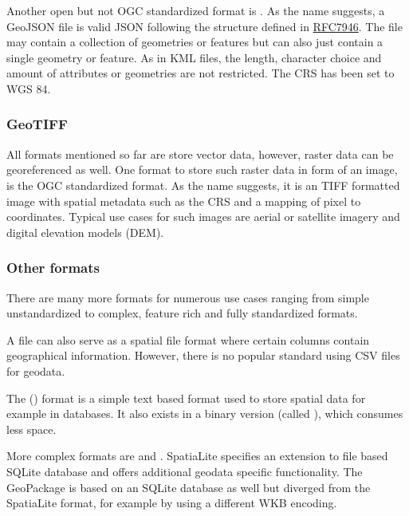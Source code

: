 			Another open but not OGC standardized format is .
			As the name suggests, a GeoJSON file is valid JSON following the structure defined in \href{https://datatracker.ietf.org/doc/html/rfc7946}{RFC7946}\cite{ietf-geojson}.
			The file may contain a collection of geometries or features but can also just contain a single geometry or feature.
			As in KML files, the length, character choice and amount of attributes or geometries are not restricted.
			The CRS has been set to WGS 84.
			
		\subsubsection{GeoTIFF}
		
			All formats mentioned so far are store vector data, however, raster data can be georeferenced as well.
			One format to store such raster data in form of an image, is the OGC standardized  format.
			As the name suggests, it is an TIFF formatted image with spatial metadata such as the CRS and a mapping of pixel to coordinates\cite{ogc-geotiff}.
			Typical use cases for such images are aerial or satellite imagery and digital elevation models (DEM).
			
		\subsubsection{Other formats}
		
		
			There are many more formats for numerous use cases ranging from simple unstandardized to complex, feature rich and fully standardized formats.
			
			A  file can also serve as a spatial file format where certain columns contain geographical information.
			However, there is no popular standard using CSV files for geodata.
			
			The  () format is a simple text based format used to store spatial data for example in databases.
			It also exists in a binary version (called ), which consumes less space.
			
			More complex formats are  and .
			SpatiaLite specifies an extension to file based SQLite database and offers additional geodata specific functionality\cite{spatialite-website}.
			The GeoPackage is based on an SQLite database as well but diverged from the SpatiaLite format, for example by using a different WKB encoding\cite{geopackage-faq}.
			
